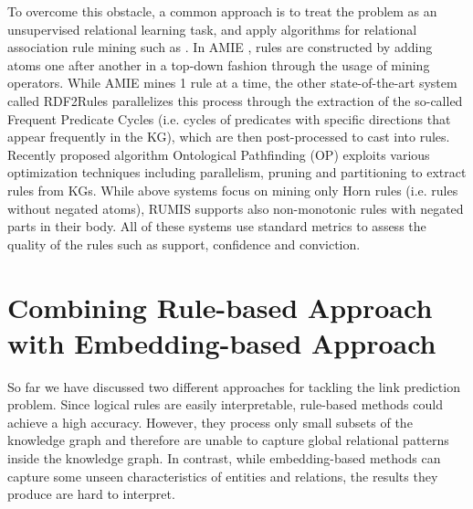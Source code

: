 To overcome this obstacle, a common approach is to treat the problem as an unsupervised relational learning task, and apply algorithms for relational association rule mining such as \cite{DBLP:conf/esf/GoethalsB02,amie,rdf2rules,Chen:2016:OP:2882903.2882954,trantowards}. In AMIE \cite{amie-old,amie}, rules are constructed by adding atoms one after another in a top-down fashion through the usage of mining operators. While AMIE mines 1 rule at a time, the other state-of-the-art system called RDF2Rules \cite{rdf2rules} parallelizes this process through the extraction of the so-called Frequent Predicate Cycles (i.e. cycles of predicates with specific directions that appear frequently in the KG), which are then post-processed to cast into rules. Recently proposed algorithm Ontological Pathfinding (OP) \cite{Chen:2016:OP:2882903.2882954} exploits various optimization techniques including parallelism, pruning and partitioning to extract rules from KGs. While above systems focus on mining only Horn rules (i.e. rules without negated atoms), RUMIS \cite{trantowards} supports also non-monotonic rules with negated parts in their body. All of these systems use standard metrics to assess the quality of the rules such as support, confidence and conviction.




\section{Combining Rule-based Approach with Embedding-based Approach}\label{related_work:combine}
So far we have discussed two different approaches for tackling the link prediction problem. Since logical rules are easily interpretable, rule-based methods could achieve a high accuracy. However, they process only small subsets of the knowledge graph and therefore are unable to capture global relational patterns inside the knowledge graph. In contrast, while embedding-based methods can capture some unseen characteristics of entities and relations, the results they produce are hard to interpret.

